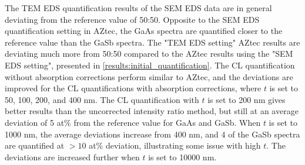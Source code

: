 The TEM EDS quantification results of the SEM EDS data are in general deviating from the reference value of 50:50.
Opposite to the SEM EDS quantification setting in AZtec, the GaAs spectra are quantified closer to the reference value than the GaSb spectra.
The "TEM EDS setting" AZtec results are deviating much more from 50:50 compared to the AZtec results using the "SEM EDS setting", presented in \cref{results:initial_quantification}.
The CL quantification without absorption corrections perform similar to AZtec, and the deviations are improved for the CL quantifications with absorption corrections, where $t$ is set to 50, 100, 200, and 400 nm.
The CL quantification with $t$ is set to 200 nm gives better results than the uncorrected intensity ratio method, but still at an average deviation of 5 at\% from the reference value for GaAs and GaSb.
When $t$ is set to 1000 nm, the average deviations increase from 400 nm, and 4 of the GaSb spectra are quantified at $> 10$ at\% deviation, illustrating some issue with high $t$.
The deviations are increased further when $t$ is set to 10000 nm.


